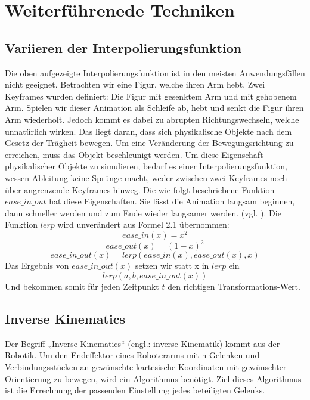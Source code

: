 \chapter{Weiterführenede Techniken}
\label{cha:weitere_techniken}
%
%
\section{Variieren der Interpolierungsfunktion}
\label{sec:var_der_interpolierungsfunktion}
%
Die oben aufgezeigte Interpolierungsfunktion ist in den meisten Anwendungsfällen nicht geeignet. Betrachten wir eine Figur, welche ihren Arm hebt. Zwei Keyframes wurden definiert: Die Figur mit gesenktem Arm und mit gehobenem Arm. Spielen wir dieser Animation als Schleife ab, hebt und senkt die Figur ihren Arm wiederholt. Jedoch kommt es dabei zu abrupten Richtungswechseln, welche unnatürlich wirken. Das liegt daran, dass sich physikalische Objekte nach dem Gesetz der Trägheit bewegen. Um eine Veränderung der Bewegungsrichtung zu erreichen, muss das Objekt beschleunigt werden.\newline\newline
Um diese Eigenschaft physikalischer Objekte zu simulieren, bedarf es einer Interpolierungsfunktion, wessen Ableitung keine Sprünge macht, weder zwischen zwei Keyframes noch über angrenzende Keyframes hinweg. \newline\newline
%
Die wie folgt beschriebene Funktion $ease\_in\_out$ hat diese Eigenschaften. Sie lässt die Animation langsam beginnen, dann schneller werden und zum Ende wieder langsamer werden. (vgl. \cite{Febucci2018}). Die Funktion $lerp$ wird unverändert aus Formel 2.1 übernommen:
%
\begin{equation}
	ease\_in(x) = x^2
\end{equation}
\begin{equation}
	ease\_out(x) = (1-x)^2
\end{equation}
\begin{equation}
	ease\_in\_out(x) = lerp(ease\_in(x), ease\_out(x), x)
\end{equation}
\newline
Das Ergebnis von $ease\_in\_out(x)$ setzen wir statt x in $lerp$ ein
%
\begin{equation}
	lerp(a,b,ease\_in\_out(x))
\end{equation}
%
Und bekommen somit für jeden Zeitpunkt $t$ den richtigen Transformations-Wert.

\section{Inverse Kinematics}
%
Der Begriff „Inverse Kinematics“ (engl.: inverse Kinematik) kommt aus der Robotik. Um den Endeffektor eines Roboterarms mit n Gelenken und Verbindungsstücken an gewünschte kartesische Koordinaten mit gewünschter Orientierung zu bewegen, wird ein Algorithmus benötigt. Ziel dieses Algorithmus ist die Errechnung der passenden Einstellung jedes beteiligten Gelenks.\newline\newline

